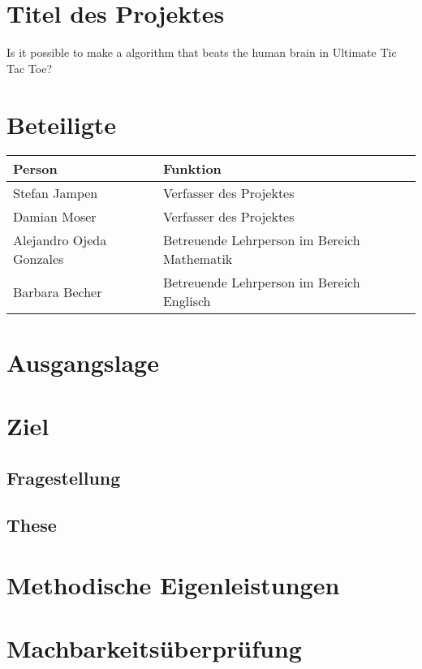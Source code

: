 \section{Titel des Projektes}
Is it possible to make a algorithm that beats the human brain in Ultimate Tic Tac Toe?

\section{Beteiligte}
\begin{tabularx}{\textwidth}{l|X}
\textbf{Person} & \textbf{Funktion} \\\hline
Stefan Jampen & Verfasser des Projektes \\
Damian Moser & Verfasser des Projektes \\
Alejandro Ojeda Gonzales & Betreuende Lehrperson im Bereich Mathematik \\
Barbara Becher & Betreuende Lehrperson im Bereich Englisch \\
\end{tabularx}

\section{Ausgangslage}

\section{Ziel}

\subsection{Fragestellung}

\subsection{These}

\section{Methodische Eigenleistungen}

\section{Machbarkeitsüberprüfung}

